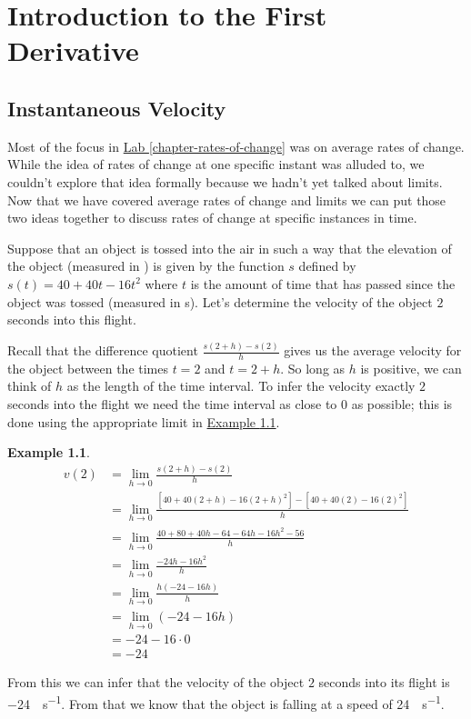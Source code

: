\documentclass[10pt,oneside,]{book}
\theoremstyle{plain}
\theoremstyle{definition}
\newtheorem{example}[theorem]{Example}
\numberwithin{equation}{section}
\newcommand{\fe}[2]{#1\mathopen{}\left(#2\right)\mathclose{}}
\begin{document}
\chapter[Introduction to the First Derivative]{Introduction to the First Derivative}\label{chapter-introduction-first-derivative}
\typeout{************************************************}
\typeout{************************************************}
\section[Instantaneous Velocity]{Instantaneous Velocity}\label{section-instantaneous-velocity}
Most of the focus in \hyperref[chapter-rates-of-change]{Lab \ref{chapter-rates-of-change}} was on average rates of change. While the idea of rates of change at one specific instant was alluded to, we couldn't explore that idea formally because we hadn't yet talked about limits. Now that we have covered average rates of change and limits we can put those two ideas together to discuss rates of change at specific instances in time.%
\par
Suppose that an object is tossed into the air in such a way that the elevation of the object (measured in \si{\foot}) is given by the function \(s\) defined by \(\fe{s}{t}=40+40t-16t^2\) where \(t\) is the amount of time that has passed since the object was tossed (measured in \si{\second}). Let's determine the velocity of the object \(2\) seconds into this flight.%
\par
Recall that the difference quotient \(\frac{\fe{s}{2+h}-\fe{s}{2}}{h}\) gives us the average velocity for the object between the times \(t=2\) and \(t=2+h\). So long as \(h\) is positive, we can think of \(h\) as the length of the time interval. To infer the velocity exactly \(2\) seconds into the flight we need the time interval as close to \(0\) as possible; this is done using the appropriate limit in \hyperref[example-instantaneous-velocity]{Example \ref{example-instantaneous-velocity}}.%
\begin{example}\label{example-instantaneous-velocity}
\begin{align*}
\fe{v}{2}&=\lim_{h\to0}\frac{\fe{s}{2+h}-\fe{s}{2}}{h}\\
&=\lim_{h\to0}\frac{\left[40+40\left(2+h\right)-16\left(2+h\right)^2\right]-\left[40+40(2)-16(2)^2\right]}{h}\\
&=\lim_{h\to0}\frac{40+80+40h-64-64h-16h^2-56}{h}\\
&=\lim_{h\to0}\frac{-24h-16h^2}{h}\\
&=\lim_{h\to0}\frac{h\left(-24-16h\right)}{h}\\
&=\lim_{h\to0}\left(-24-16h\right)\\
&=-24-16\cdot0\\
&=-24
\end{align*}%
\par
From this we can infer that the velocity of the object \(2\) seconds into its flight is \SI{-24}{\foot\per\second}. From that we know that the object is falling at a speed of \SI{24}{\foot\per\second}.%
\end{example}
\end{document}
